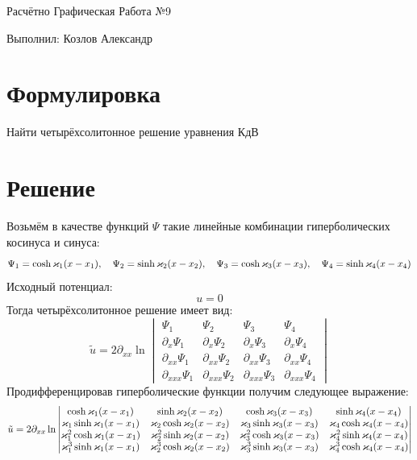 \documentclass[titlepage]{article}
\begin{document}
\begin{flushright}
    Расчётно Графическая Работа №9
    
    Выполнил: Козлов Александр
\end{flushright}
\section{Формулировка}
Найти четырёхсолитонное решение уравнения КдВ
\section{Решение}
Возьмём в качестве функций $\Psi$ такие линейные комбинации гиперболических косинуса и синуса:
\begin{equation}
 \Psi_1 = \cosh{\varkappa_1\qty(x - x_1)},\quad  \Psi_2 = \sinh{\varkappa_2\qty(x - x_2)},\quad  \Psi_3 = \cosh{\varkappa_3\qty(x - x_3)},\quad  \Psi_4 = \sinh{\varkappa_4\qty(x - x_4)}
\end{equation}
Исходный потенциал:
\begin{equation}
 u = 0
\end{equation}
Тогда четырёхсолитонное решение имеет вид:
\begin{equation}
 \tilde{u} = 2 \partial_{xx} \ln{
 \begin{vmatrix}
  \Psi_1&\Psi_2&\Psi_3&\Psi_4\\
  \partial_{x}\Psi_1&\partial_{x} \Psi_2 &\partial_{x} \Psi_3 &\partial_{x} \Psi_4\\
  \partial_{xx} \Psi_1 &\partial_{xx} \Psi_2 &\partial_{xx} \Psi_3 &\partial_{xx} \Psi_4\\
  \partial_{xxx} \Psi_1 &\partial_{xxx} \Psi_2 &\partial_{xxx} \Psi_3 &\partial_{xxx} \Psi_4
 \end{vmatrix}
 }
\end{equation}
Продифференцировав гиперболические функции получим следующее выражение:
\begin{equation}
\tilde{u} = 2 \partial_{xx} \ln{
 \begin{vmatrix}
  \cosh{\varkappa_1\qty(x - x_1)}
  &\sinh{\varkappa_2\qty(x - x_2)}
  &\cosh{\varkappa_3\qty(x - x_3)}
  &\sinh{\varkappa_4\qty(x - x_4)}\\
  
  \varkappa_1\sinh{\varkappa_1\qty(x - x_1)}
  &\varkappa_2\cosh{\varkappa_2\qty(x - x_2)} 
  &\varkappa_3\sinh{\varkappa_3\qty(x - x_3)} 
  &\varkappa_4\cosh{\varkappa_4\qty(x - x_4)}\\
  
  \varkappa_1^2\cosh{\varkappa_1\qty(x - x_1)}
  &\varkappa_2^2\sinh{\varkappa_2\qty(x - x_2)}
  &\varkappa_3^2\cosh{\varkappa_3\qty(x - x_3)} 
  &\varkappa_4^2\sinh{\varkappa_4\qty(x - x_4)}\\
  
  \varkappa_1^3\sinh{\varkappa_1\qty(x - x_1)}
  &\varkappa_2^3\cosh{\varkappa_2\qty(x - x_2)}&\varkappa_3^3\sinh{\varkappa_3\qty(x - x_3)} &\varkappa_4^3\cosh{\varkappa_4\qty(x - x_4)}
 \end{vmatrix}
 }
\end{equation}
\end{document}
